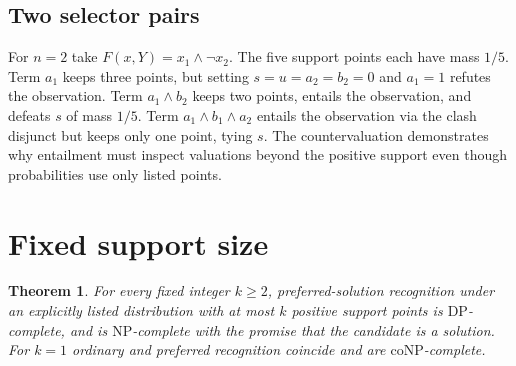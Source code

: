 \documentclass[11pt,a4paper]{amsart}
\newtheorem{theorem}{Theorem}
\newcommand{\DP}{\mathrm{DP}}
\newcommand{\NP}{\mathrm{NP}}
\newcommand{\coNP}{\mathrm{coNP}}
\begin{document}
\subsection*{Two selector pairs}
For $n=2$ take $F(x,Y)=x_1\land\neg x_2$. The five support points each have mass $1/5$. Term $a_1$ keeps three points, but setting $s=u=a_2=b_2=0$ and $a_1=1$ refutes the observation. Term $a_1\land b_2$ keeps two points, entails the observation, and defeats $s$ of mass $1/5$. Term $a_1\land b_1\land a_2$ entails the observation via the clash disjunct but keeps only one point, tying $s$. The countervaluation demonstrates why entailment must inspect valuations beyond the positive support even though probabilities use only listed points.

\section{Fixed support size}
\begin{theorem}
For every fixed integer $k\geq2$, preferred-solution recognition under an explicitly listed distribution with at most $k$ positive support points is $\DP$-complete, and is $\NP$-complete with the promise that the candidate is a solution. For $k=1$ ordinary and preferred recognition coincide and are $\coNP$-complete.
\end{theorem}
\end{document}

